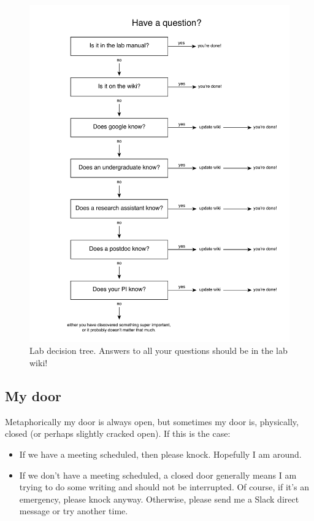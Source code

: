 \documentclass[letterpaper,12pt,oneside]{memoir}
\begin{document}
\begin{figure}
\label{fig:decisiontree}
\includegraphics[width=\textwidth]{figures/lab_decision_tree.pdf}
\caption{Lab decision tree. Answers to all your questions should be in the lab wiki!}
\end{figure}

\subsection{My door}
Metaphorically my door is always open, but sometimes my door is, physically, closed (or perhaps slightly cracked open). If this is the case:

\begin{itemize}
\item If we have a meeting scheduled, then please knock. Hopefully I am around.

\item If we don't have a meeting scheduled, a closed door generally means I am trying to do some writing and should not be interrupted. Of course, if it's an emergency, please knock anyway. Otherwise, please send me a Slack direct message or try another time.
\end{itemize}
\end{document}
